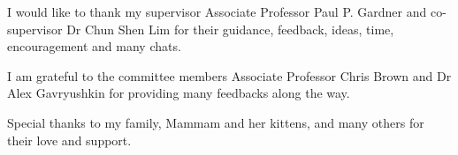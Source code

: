 \begin{acknowledgements}
I would like to thank my supervisor Associate Professor Paul P. Gardner and  co-supervisor Dr Chun Shen Lim for their guidance, feedback, ideas, time, encouragement and many chats.

I am grateful to the committee members Associate Professor Chris Brown and Dr Alex Gavryushkin for providing many feedbacks along the way.


Special thanks to my family, Mammam and her kittens, and many others for their love and support.

\end{acknowledgements}
